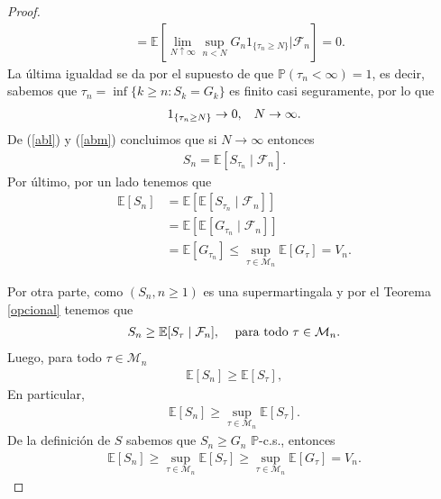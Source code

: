 \begin{proof}
\begin{align}
	& = \mathbb{E} \left[ \lim_{N \uparrow \infty} \sup_{n < N} G_n 1_{\{\tau_n \geq N\}} \bigg | \mathcal{F}_n \right] = 0. \label{abm}
	\end{align}
La última igualdad se da por el supuesto de que $\mathbb{P}(\tau_n < \infty) = 1$, es decir, sabemos que $\tau_n = \inf \{k \geq n : S_k = G_k \}$ es finito casi seguramente, por lo que
	\begin{align*}
	1_{ \{ \tau_n \geq N \} } \rightarrow 0, \hspace{0.3cm} N \rightarrow \infty.
	\end{align*}
De (\ref{abl}) y (\ref{abm}) concluimos que si $N \rightarrow \infty$ entonces
	\begin{align*}
	S_n = \mathbb{E}[S_{\tau_n} \mid \mathcal{F}_n].
	\end{align*}
Por último, por un lado tenemos que 
	\begin{align}
	\mathbb{E}[S_n] & = \mathbb{E}[\mathbb{E}[S_{\tau_n} \mid \mathcal{F}_n]] \nonumber \\
	& = \mathbb{E}[\mathbb{E}[G_{\tau_n} \mid \mathcal{F}_n]] \nonumber \\
	& = \mathbb{E}[G_{\tau_n}] \leq \sup_{\tau \in \mathcal{M}_n} \mathbb{E}[G_{\tau}] = V_n. \label{abn}
	\end{align}

Por otra parte, como $(S_n, n \geq 1)$ es una supermartingala y por el Teorema \ref{opcional} tenemos que
	\begin{align*}
	S_n \geq \mathbb{E}[S_\tau \mid \mathcal{F}_n], \hspace{0.3cm} \text{ para todo } \tau \in \mathcal{M}_n.
	\end{align*}
Luego, para todo $\tau \in \mathcal{M}_n$
	\begin{align*}
	\mathbb{E}[S_n] \geq \mathbb{E}[S_\tau],
	\end{align*}
En particular, 
	\begin{align*}
	\mathbb{E}[S_n] \geq \sup_{\tau \in \mathcal{M}_n} \mathbb{E}[S_\tau ].
	\end{align*}
De la definición de $S$ sabemos que $S_n \geq G_n$ $\mathbb{P}$-c.s., entonces
	\begin{align}
	\mathbb{E}[S_n] \geq \sup_{\tau \in \mathcal{M}_n}\mathbb{E}[S_\tau] \geq \sup_{\tau \in \mathcal{M}_n}\mathbb{E}[G_\tau] = V_n. \label{abo}
	\end{align}


\end{proof}
